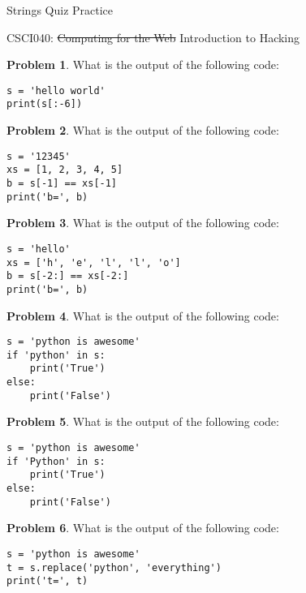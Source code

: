 \documentclass[10pt]{article}
\theoremstyle{definition}
\newtheorem{problem}{Problem}
\begin{document}
\begin{center}
    {
\Large
    Strings Quiz Practice
}

    \vspace{0.1in}
    CSCI040: \sout{Computing for the Web} Introduction to Hacking

    \vspace{0.1in}
\end{center}


\vspace{0.15in}

\begin{problem}
    What is the output of the following code:
\end{problem}
\begin{lstlisting}
s = 'hello world'
print(s[:-6])
\end{lstlisting}
\vspace{1in}

\begin{problem}
    What is the output of the following code:
\end{problem}
\begin{lstlisting}
s = '12345'
xs = [1, 2, 3, 4, 5]
b = s[-1] == xs[-1]
print('b=', b)
\end{lstlisting}
\vspace{1.5in}

\begin{problem}
    What is the output of the following code:
\end{problem}
\begin{lstlisting}
s = 'hello'
xs = ['h', 'e', 'l', 'l', 'o']
b = s[-2:] == xs[-2:]
print('b=', b)
\end{lstlisting}
\vspace{1.5in}

\newpage
\begin{problem}
    What is the output of the following code:
\end{problem}
\begin{lstlisting}
s = 'python is awesome'
if 'python' in s:
    print('True')
else:
    print('False')
\end{lstlisting}
\vspace{1.5in}

\begin{problem}
    What is the output of the following code:
\end{problem}
\begin{lstlisting}
s = 'python is awesome'
if 'Python' in s:
    print('True')
else:
    print('False')
\end{lstlisting}
\vspace{1.5in}
\begin{problem}
    What is the output of the following code:
\end{problem}
\begin{lstlisting}
s = 'python is awesome'
t = s.replace('python', 'everything')
print('t=', t)
\end{lstlisting}
\vspace{1.5in}
\end{document}
